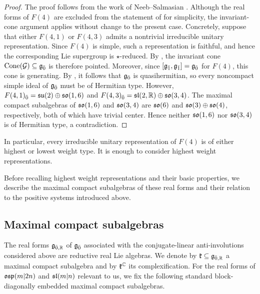 \begin{proof} The proof follows from the work of Neeb--Salmasian \cite{neeb2011lie}. Although the real forms of $F(4)$ are excluded from the statement of \cite[Theorem~6.2.1]{neeb2011lie} for simplicity, the invariant-cone argument applies without change to the present case. Concretely, suppose that either $F(4,1)$ or $F(4,3)$ admits a nontrivial irreducible unitary representation. Since $F(4)$ is simple, such a representation is faithful, and hence the corresponding Lie supergroup is $\star$-reduced. By \cite[Proposition~6.1.2(i)]{neeb2011lie}, the invariant cone $\operatorname{Cone}(\mathcal{G})\subseteq\even$ is therefore pointed. Moreover, since $[\odd,\odd]=\even$ for $F(4)$, this cone is generating. By \cite[Section~5.3]{neeb2011lie}, it follows that $\even$ is quasihermitian, so every noncompact simple ideal of $\even$ must be of Hermitian type. However, $F(4,1)_{\bar0}=\su(2)\oplus\so(1,6)$ and $F(4,3)_{\bar0}=\sl(2,\RR)\oplus\so(3,4)$. The maximal compact subalgebras of $\so(1,6)$ and $\so(3,4)$ are $\so(6)$ and $\so(3)\oplus\so(4)$, respectively, both of which have trivial center. Hence neither $\so(1,6)$ nor $\so(3,4)$ is of Hermitian type, a contradiction. 
\end{proof}

In particular, every irreducible unitary representation of $F(4)$ is
of either highest or lowest weight type. It is enough to consider highest weight
representations.

Before recalling highest weight representations and their basic properties, we describe the maximal compact subalgebras of these real forms and their relation to the positive systems introduced above.

\subsection{Maximal compact subalgebras}\label{subsec::maximal_compact_subalgebra}

The real forms $\gg_{\bar0,\RR}$ of $\even$ associated with the conjugate-linear anti-involutions considered above are reductive real Lie algebras. We denote by $\kk\subseteq\gg_{\bar0,\RR}$ a maximal compact subalgebra and by $\kk^{\CC}$ its complexification. For the real forms of $\osp(m\vert 2n)$ and $\sl(m\vert n)$ relevant to us, we fix the following standard block-diagonally embedded maximal compact subalgebras.

